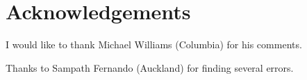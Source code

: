\chapter{Acknowledgements}
I would like to thank Michael Williams (Columbia) for his comments.

Thanks to Sampath Fernando (Auckland) for finding several errors.
